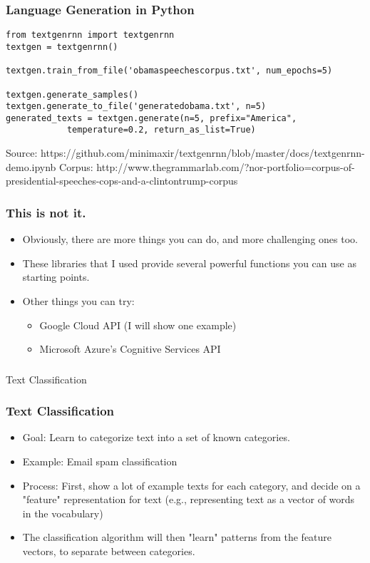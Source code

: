 \documentclass{beamer}
\begin{document}
\begin{frame}[fragile]
\frametitle{Language Generation in Python}
\small
\begin{verbatim}
from textgenrnn import textgenrnn
textgen = textgenrnn()

textgen.train_from_file('obamaspeechescorpus.txt', num_epochs=5)

textgen.generate_samples()
textgen.generate_to_file('generatedobama.txt', n=5)
generated_texts = textgen.generate(n=5, prefix="America", 
			temperature=0.2, return_as_list=True)
\end{verbatim}

\tiny
Source: https://github.com/minimaxir/textgenrnn/blob/master/docs/textgenrnn-demo.ipynb
Corpus: http://www.thegrammarlab.com/?nor-portfolio=corpus-of-presidential-speeches-cops-and-a-clintontrump-corpus
\end{frame}


\begin{frame}
\frametitle{This is not it.}
\begin{itemize}
\item Obviously, there are more things you can do, and more challenging ones too.
\item These libraries that I used provide several powerful functions you can use as starting points. 
\item Other things you can try:
\begin{itemize}
\item Google Cloud API (I will show one example)
\item Microsoft Azure's Cognitive Services API
\end{itemize}
\end{itemize}
\end{frame}

\begin{frame}
\frametitle{}
\Large Text Classification
\end{frame}

\begin{frame}
\frametitle{Text Classification}
\begin{itemize}
\item Goal: Learn to categorize text into a set of known categories.
\item Example: Email spam classification
\item Process: First, show a lot of example texts for each category, and decide on a "feature" representation for text (e.g., representing text as a vector of words in the vocabulary)
\item The classification algorithm will then "learn" patterns from the feature vectors, to separate between categories.
\end{itemize}
\end{frame}
\end{document}
